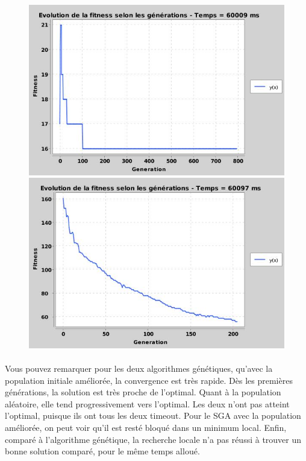 	\begin{figure}[H]
	\centering
		\begin{minipage}{.5\textwidth}
		  \centering
		  \includegraphics[width=1\linewidth]{images/c16 - SGA with improved pop gen.jpg}
		\end{minipage}%
		\begin{minipage}{.5\textwidth}
		  \centering
		  \includegraphics[width=1\linewidth]{images/c16 - SGA with random pop gen.jpg}
		\end{minipage}
	\end{figure}

	\paragraph{} Vous pouvez remarquer pour les deux algorithmes génétiques, qu'avec la population initiale améliorée, la convergence est très rapide. Dès les premières
générations, la solution est très proche de l'optimal. Quant à la population aléatoire, elle tend progressivement vers l'optimal. Les deux n'ont pas atteint l'optimal, puisque ils ont tous les deux timeout.
Pour le SGA avec la population améliorée, on peut voir qu'il est resté bloqué dans un minimum local.
	Enfin, comparé à l'algorithme génétique, la recherche locale n'a pas réussi à trouver un bonne solution comparé, pour le même temps alloué.

